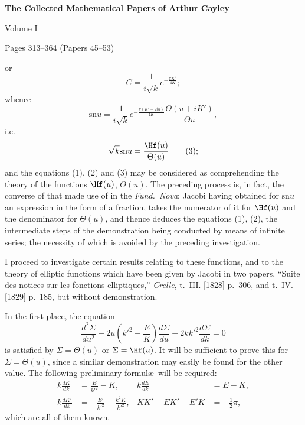 \documentclass[11pt,a4paper]{book}
\providecommand{\sn}{\mathrm{sn}}
\begin{document}
\begin{center}
\Large\bfseries The Collected Mathematical Papers of Arthur Cayley

\medskip
\large Volume I

\medskip
\normalsize Pages 313--364 (Papers 45--53)
\end{center}


\newpage


or
\[
C = \frac{1}{i\sqrt{k}} e^{-\frac{\pi K'}{4K}};
\]
whence
\[
\sn u = \frac{1}{i\sqrt{k}} e^{-\frac{\pi(K' - 2iu)}{4K}} \frac{\Theta(u + iK')}{\Theta u},
\]
i.e.
\[
\sqrt{k} \sn u = \frac{\Hf(u)}{\Theta(u)} \tag{3};
\]
and the equations (1), (2) and (3) may be considered as comprehending the theory of the functions $\Hf(u)$, $\Theta(u)$. The preceding process is, in fact, the converse of that made use of in the \textit{Fund.~Nova}; Jacobi having obtained for $\sn u$ an expression in the form of a fraction, takes the numerator of it for $\Hf(u)$ and the denominator for $\Theta(u)$, and thence deduces the equations (1), (2), the intermediate steps of the demonstration being conducted by means of infinite series; the necessity of which is avoided by the preceding investigation.

I proceed to investigate certain results relating to these functions, and to the theory of elliptic functions which have been given by Jacobi in two papers, ``Suite des notices sur les fonctions elliptiques,'' \textit{Crelle}, t.~III. [1828] p.~306, and t.~IV. [1829] p.~185, but without demonstration.

In the first place, the equation
\[
\frac{d^2 \Sigma}{du^2} - 2u\left(k'^2 - \frac{E}{K}\right)\frac{d\Sigma}{du} + 2kk'^2 \frac{d\Sigma}{dk} = 0 \tag{4}
\]
is satisfied by $\Sigma = \Theta(u)$ or $\Sigma = \Hf(u)$. It will be sufficient to prove this for $\Sigma = \Theta(u)$, since a similar demonstration may easily be found for the other value. The following preliminary formul\ae\ will be required:
\begin{align*}
k \frac{dK}{dk} &= \frac{E}{k'^2} - K, & k \frac{dE}{dk} &= E - K, \\
k \frac{dK'}{dk} &= -\frac{E'}{k'^2} + \frac{k^2 K}{k'^2}, & KK' - EK' - E'K &= -\tfrac{1}{2}\pi,
\end{align*}
which are all of them known.
\end{document}

